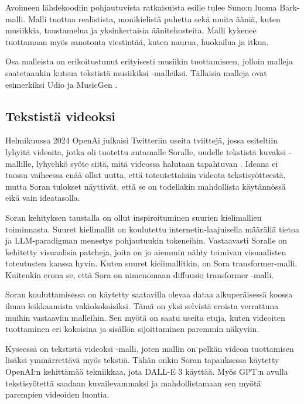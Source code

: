 Avoimeen lähdekoodiin pohjautuvista ratkaisuista esille tulee Suno:n luoma
Bark-malli. Malli tuottaa realistista, monikielistä puhetta sekä muita ääniä,
kuten musiikkia, taustamelua ja yksinkertaisia äänitehosteita. Malli kykenee
tuottamaan myös sanotonta viestintää, kuten naurua, huokailua ja itkua.
\parencite{githubSunoAiBark}

Osa malleista on erikoitustunut erityisesti musiikin tuottamiseen, jolloin
malleja saatetaankin kutsua tekstistä musiikiksi -malleiksi. Tällaisia malleja
ovat esimerkiksi Udio \parencite{udioAboutUs} ja MusicGen
\parencite{copet2024simplecontrollablemusicgeneration}.

\subsection{Tekstistä videoksi}

Helmikuussa 2024 OpenAi julkaisi Twitteriin useita tviittejä, jossa esiteltiin
lyhyitä videoita, jotka oli tuotettu antamalle Soralle, uudelle tekstistä
kuvaksi -mallille, lyhyehkö syöte siitä, mitä videossa halutaan tapahtuvan
\parencite{twitter1758192957386342435}. Ideana ei tuossa vaiheessa enää ollut
uutta, että toteutettaisiin videota tekstisyötteestä, mutta Soran tulokset
näyttivät, että se on todellakin mahdollista käytännössä eikä vain ideatasolla.

Soran kehityksen taustalla on ollut inspiroituminen suurien kielimallien
toiminnasta. Suuret kielimallit on koulutettu internetin-laajuisella määrällä
tietoa ja LLM-paradigman menestys pohjautuukin tokeneihin. Vastaavasti Soralle
on kehitetty visuaalisia patcheja, joita on jo aiemmin nähty toimivan
visuaalisten toteutusten kanssa hyvin. Kuten suuret kielimallitkin, on Sora
transformer-malli. Kuitenkin erona se, että Sora on nimenomaan diffuusio
transformer -malli. \parencite{openAISoraReport}

Soran kouluttamisessa on käytetty saatavilla olevaa dataa alkuperäisessä koossa
ilman leikkaamista vakiokokoisiksi. Tämä on yksi selvistä eroista verrattuna
muihin vastaaviin malleihin. Sen myötä on saatu useita etuja, kuten videoiten
tuottaminen eri kokoisina ja sisällön sijoittaminen paremmin näkyviin.
\parencite{openAISoraReport}

Kyseessä on tekstistä videoksi -malli, joten mallin on pelkän videon
tuottamisen lisäksi ymmärrettävä myös tekstiä. Tähän onkin Soran tapauksessa
käytetty OpenAI:n kehittämää tekniikkaa, jota DALL-E 3 käyttää. Myös GPT:n
avulla tekstisyötettä saadaan kuvailevammaksi ja mahdollistamaan sen myötä
parempien videoiden luontia. \parencite{openAISoraReport}

